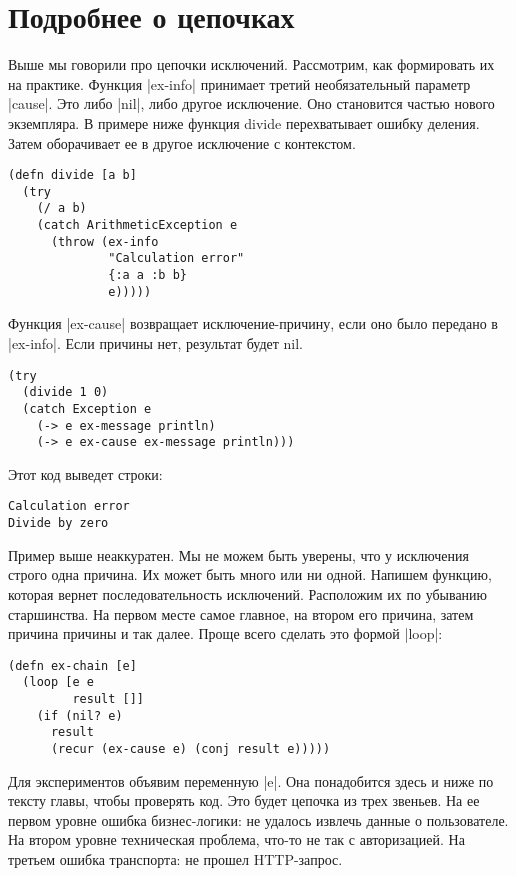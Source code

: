 \section{Подробнее о цепочках}

Выше мы говорили про цепочки исключений. Рассмотрим, как формировать их на
практике. Функция \spverb|ex-info| принимает третий необязательный параметр
\spverb|cause|. Это либо \spverb|nil|, либо другое исключение. Оно становится частью нового
экземпляра. В примере ниже функция divide перехватывает ошибку деления. Затем
оборачивает ее в другое исключение с контекстом.

\begin{verbatim}
(defn divide [a b]
  (try
    (/ a b)
    (catch ArithmeticException e
      (throw (ex-info
              "Calculation error"
              {:a a :b b}
              e)))))
\end{verbatim}

Функция \spverb|ex-cause| возвращает исключение-причину, если оно было передано в
\spverb|ex-info|. Если причины нет, результат будет nil.

\begin{verbatim}
(try
  (divide 1 0)
  (catch Exception e
    (-> e ex-message println)
    (-> e ex-cause ex-message println)))
\end{verbatim}

Этот код выведет строки:

\begin{verbatim}
Calculation error
Divide by zero
\end{verbatim}

Пример выше неаккуратен. Мы не можем быть уверены, что у исключения строго одна
причина. Их может быть много или ни одной. Напишем функцию, которая вернет
последовательность исключений. Расположим их по убыванию старшинства. На первом
месте самое главное, на втором его причина, затем причина причины и так
далее. Проще всего сделать это формой \spverb|loop|:

\begin{verbatim}
(defn ex-chain [e]
  (loop [e e
         result []]
    (if (nil? e)
      result
      (recur (ex-cause e) (conj result e)))))
\end{verbatim}

Для экспериментов объявим переменную \spverb|e|. Она понадобится здесь и ниже по тексту
главы, чтобы проверять код. Это будет цепочка из трех звеньев. На ее первом
уровне ошибка бизнес-логики: не удалось извлечь данные о пользователе. На втором
уровне техническая проблема, что-то не так с авторизацией. На третьем ошибка
транспорта: не прошел HTTP-запрос.

